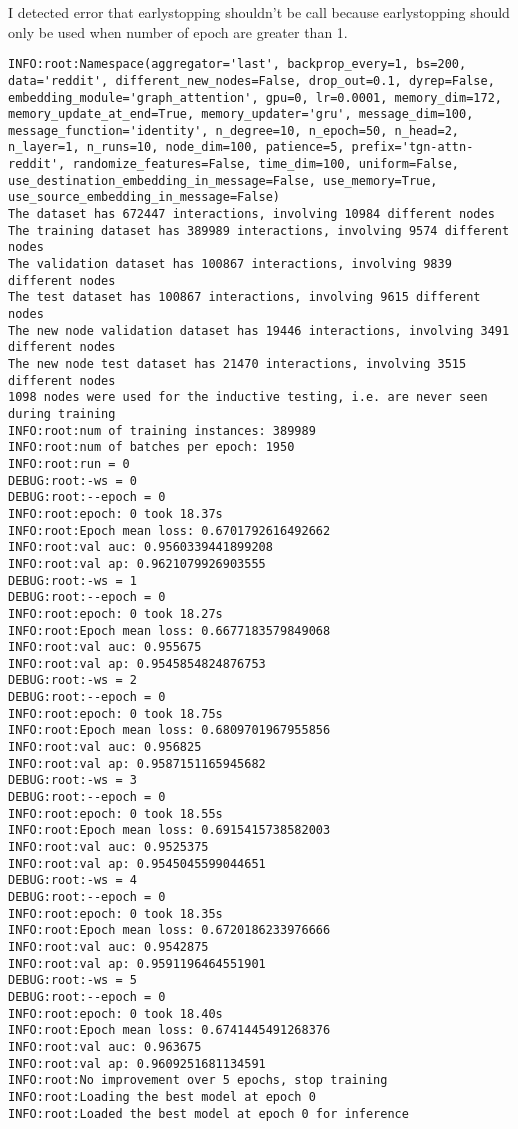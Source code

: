 \documentclass[11pt]{article}
\begin{document}
I detected error that earlystopping shouldn't be call because earlystopping should only be used when number of epoch are greater than 1.
\begin{verbatim}
INFO:root:Namespace(aggregator='last', backprop_every=1, bs=200, data='reddit', different_new_nodes=False, drop_out=0.1, dyrep=False, embedding_module='graph_attention', gpu=0, lr=0.0001, memory_dim=172, memory_update_at_end=True, memory_updater='gru', message_dim=100, message_function='identity', n_degree=10, n_epoch=50, n_head=2, n_layer=1, n_runs=10, node_dim=100, patience=5, prefix='tgn-attn-reddit', randomize_features=False, time_dim=100, uniform=False, use_destination_embedding_in_message=False, use_memory=True, use_source_embedding_in_message=False)
The dataset has 672447 interactions, involving 10984 different nodes
The training dataset has 389989 interactions, involving 9574 different nodes
The validation dataset has 100867 interactions, involving 9839 different nodes
The test dataset has 100867 interactions, involving 9615 different nodes
The new node validation dataset has 19446 interactions, involving 3491 different nodes
The new node test dataset has 21470 interactions, involving 3515 different nodes
1098 nodes were used for the inductive testing, i.e. are never seen during training
INFO:root:num of training instances: 389989
INFO:root:num of batches per epoch: 1950
INFO:root:run = 0
DEBUG:root:-ws = 0
DEBUG:root:--epoch = 0
INFO:root:epoch: 0 took 18.37s
INFO:root:Epoch mean loss: 0.6701792616492662
INFO:root:val auc: 0.9560339441899208
INFO:root:val ap: 0.9621079926903555
DEBUG:root:-ws = 1
DEBUG:root:--epoch = 0
INFO:root:epoch: 0 took 18.27s
INFO:root:Epoch mean loss: 0.6677183579849068
INFO:root:val auc: 0.955675
INFO:root:val ap: 0.9545854824876753
DEBUG:root:-ws = 2
DEBUG:root:--epoch = 0
INFO:root:epoch: 0 took 18.75s
INFO:root:Epoch mean loss: 0.6809701967955856
INFO:root:val auc: 0.956825
INFO:root:val ap: 0.9587151165945682
DEBUG:root:-ws = 3
DEBUG:root:--epoch = 0
INFO:root:epoch: 0 took 18.55s
INFO:root:Epoch mean loss: 0.6915415738582003
INFO:root:val auc: 0.9525375
INFO:root:val ap: 0.9545045599044651
DEBUG:root:-ws = 4
DEBUG:root:--epoch = 0
INFO:root:epoch: 0 took 18.35s
INFO:root:Epoch mean loss: 0.6720186233976666
INFO:root:val auc: 0.9542875
INFO:root:val ap: 0.9591196464551901
DEBUG:root:-ws = 5
DEBUG:root:--epoch = 0
INFO:root:epoch: 0 took 18.40s
INFO:root:Epoch mean loss: 0.6741445491268376
INFO:root:val auc: 0.963675
INFO:root:val ap: 0.9609251681134591
INFO:root:No improvement over 5 epochs, stop training
INFO:root:Loading the best model at epoch 0
INFO:root:Loaded the best model at epoch 0 for inference

\end{verbatim}
\end{document}

